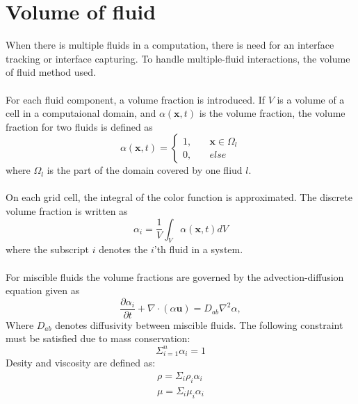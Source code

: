 \documentclass[a4paper, 12pt]{report}
\begin{document}
\section{Volume of fluid}
When there is multiple fluids in a computation, there is need for an interface tracking or interface capturing. To handle multiple-fluid interactions, the volume of fluid method used.\\
\\
For each fluid component, a volume fraction is introduced. If $V$ is a volume of a cell in a computaional domain, and $\alpha(\mathbf{x}, t)$ is the volume fraction, the volume fraction for two fluids is defined as \citep{VOF2}
\begin{equation}
\alpha(\mathbf{x},t) = \left\{
        \begin{array}{ll}
            1, & \quad \mathbf{x} \in \Omega_l \\
            0, & \quad else
        \end{array}
    \right.
\label{eqn:volumeFraction}    
\end{equation}
where $\Omega_l$ is the part of the domain covered by one fliud $l$.\\
\\
On each grid cell, the integral of the color function is approximated. The discrete volume fraction is written as \citep{VOF2}
\begin{equation}
\alpha_i = \frac{1}{V} \int_{V} \alpha(\mathbf{x},t) dV
\end{equation}
where the subscript $i$ denotes the $i$'th fluid in a system.\\
\\
For miscible fluids the volume fractions are governed by the advection-diffusion equation given as \citep{VOF1}
\begin{equation}
\frac{\partial \alpha_i}{\partial t} + \nabla \cdot (\alpha \mathbf{u}) = D_{ab}\nabla^2 \alpha,
\label{eqn:alphadiffusionEquation}
\end{equation} 
Where $D_{ab}$ denotes diffusivity between miscible fluids. The following constraint must be satisfied due to mass conservation:
\begin{equation}
\Sigma_{i=1}^n \alpha_i= 1
\label{eqn:alphaConstraint} 
\end{equation}
Desity and viscosity are defined as:
\begin{eqnarray}
\label{eqn:alphaRhodiffusion}
\rho = \Sigma_i \rho_i \alpha_i \\
\label{eqn:alphaMudiffusion}
\mu = \Sigma_i \mu_i \alpha_i
\end{eqnarray}
\end{document}

